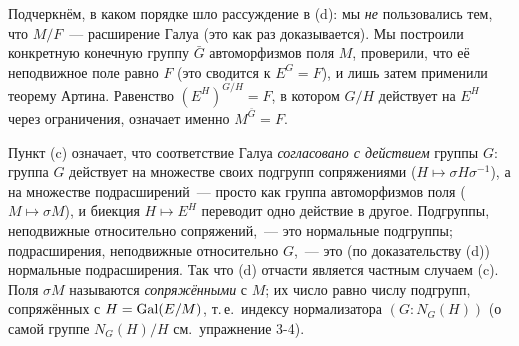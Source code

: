 Подчеркнём, в каком порядке шло рассуждение в (d): мы \emph{не} пользовались тем, что $M/F$~--- расширение Галуа (это как
раз доказывается). Мы построили конкретную конечную группу $\bar G$ автоморфизмов поля $M$, проверили, что её неподвижное
поле равно $F$ (это сводится к $E^G=F$), и лишь затем применили теорему Артина. Равенство $(E^H)^{G/H}=F$, в котором
$G/H$ действует на $E^H$ через ограничения, означает именно $M^{\bar G}=F$.

\begin{keepfig}
\begin{center}
\end{center}
\end{keepfig}

\begin{remark}[3.17a]
Пункт (c) означает, что соответствие Галуа \emph{согласовано с действием} группы $G$: группа $G$ действует на множестве
своих подгрупп сопряжениями ($H\mapsto\sigma H\sigma^{-1}$), а на множестве подрасширений~--- просто как группа
автоморфизмов поля ($M\mapsto\sigma M$), и биекция $H\mapsto E^H$ переводит одно действие в другое. Подгруппы,
неподвижные относительно сопряжений,~--- это нормальные подгруппы; подрасширения, неподвижные относительно $G$,~--- это (по
доказательству (d)) нормальные подрасширения. Так что (d) отчасти является частным случаем (c). Поля $\sigma M$ называются
\emph{сопряжёнными} с $M$; их число равно числу подгрупп, сопряжённых с $H=\operatorname{Gal}(E/M)$, т.\,е.\ индексу нормализатора
$(G:N_G(H))$ (о самой группе $N_G(H)/H$ см.\ упражнение 3-4).
\end{remark}

